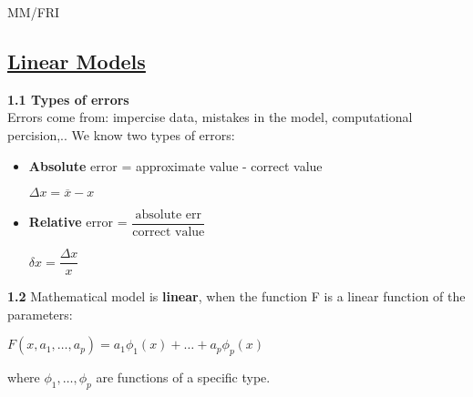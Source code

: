 \documentclass{article}
\begin{document}
\begin{center}
    {\small MM/FRI \par}
\end{center}

\begin{multicols}{2}

\section{\underline{Linear Models}}

\textbf{1.1 Types of errors}\\
Errors come from: impercise data, mistakes in the model, computational percision,..
We know two types of errors:
\begin{itemize}
    \item \textbf{Absolute} error = approximate value - correct value
        \begin{center}
            \begin{math}
                \Delta x = \overline{x} - x
            \end{math}
        \end{center}
    \item \textbf{Relative} error = $\dfrac{\text{absolute err}}{\text{correct value}}$ 
        \begin{center}
            \begin{math}
                \delta x = \dfrac{\Delta x}{x}
            \end{math}
        \end{center}
\end{itemize}

\textbf{1.2} Mathematical model is \textbf{linear},
when the function F is a linear function of the parameters:
\begin{center}
    \begin{math}
        F(x, a_1, \dots, a_p) = a_1 \phi_1(x) + \dots + a_p \phi_p(x) 
    \end{math}
\end{center} 
where $\phi_1, \dots, \phi_p$ are functions of a specific type.



\end{multicols}
\end{document}

